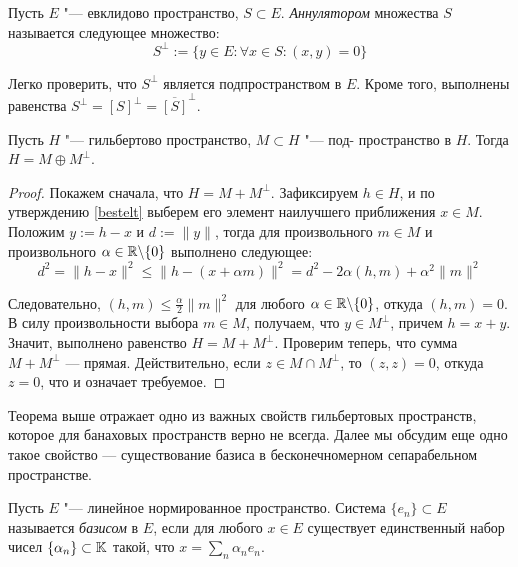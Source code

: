 \begin{definition}
	Пусть $E$ "--- евклидово пространство, $S \subset E$. \textit{Аннулятором} множества $S$ называется следующее множество:
	\[S^\perp := \{y \in E: \forall x \in S: (x, y) = 0\}\]
\end{definition}

\begin{note}
	Легко проверить, что $S^\perp$ является подпространством в $E$. Кроме того, выполнены равенства $S^\perp = [S]^\perp = \overline{[S]}^\perp$.
\end{note}

\begin{theorem}\label{thm4.3}
	Пусть $H$ "--- гильбертово пространство, {$M \subset H$ "--- под-} пространство в $H$. Тогда $H = M \oplus M^\perp$.
\end{theorem}

\begin{proof}
	Покажем сначала, что $H = M + M^\perp$. Зафиксируем $h \in H$, и по утверждению \ref{bestelt} выберем его элемент наилучшего приближения $x \in M$. Положим $y := h - x$ и $d := \|y\|$, тогда для произвольного $m \in M$ и произвольного $\alpha \in \mathbb{R} \backslash \{0\}$ выполнено следующее:
	\[d^2 = \|h - x\|^2 \le \|h - (x + \alpha m)\|^2 = d^2 - 2\alpha(h, m) + \alpha^2\|m\|^2\]

	Следовательно, $(h, m) \le \frac\alpha2\|m\|^2$ для любого $\alpha \in \mathbb{R} \backslash \{0\}$, откуда $(h, m) = 0$. В силу произвольности выбора $m \in M$, получаем, что $y \in M^\perp$, причем $h = x + y$. Значит, выполнено равенство $H = M + M^\perp$. Проверим теперь, что сумма $M + M^\perp$ --- прямая. Действительно, если $z \in M \cap M^\perp$, то $(z, z) = 0$, откуда $z = 0$, что и означает требуемое.
\end{proof}

\begin{note}
	Теорема выше отражает одно из важных свойств гильбертовых пространств, которое для банаховых пространств верно не всегда. Далее мы обсудим еще одно такое свойство --- существование базиса в бесконечномерном сепарабельном пространстве.
\end{note}

\begin{definition}
	Пусть $E$ "--- линейное нормированное пространство. Система $\{e_n\} \subset E$ называется \textit{базисом} в $E$, если для любого $x \in E$ существует единственный набор чисел $\{\alpha_n\} \subset \mathbb{K}$ такой, что $x = \sum_{n} \alpha_n e_n$.
\end{definition}

